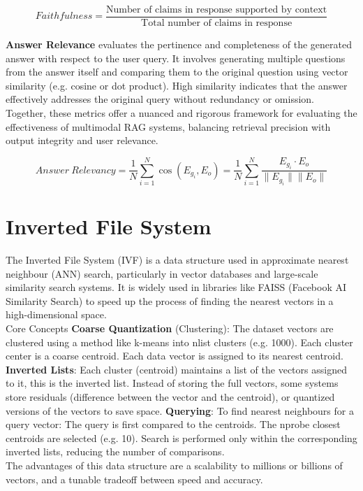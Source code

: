 \documentclass[12pt,twoside]{report}
\begin{document}
$$Faithfulness = \frac{\text{Number of claims in response supported by context}}{\text{Total number of claims in response}}$$

\textbf{Answer Relevance} evaluates the pertinence and completeness of the generated answer with respect to the user query. It involves generating multiple questions from the answer itself and comparing them to the original question using vector similarity (e.g. cosine or dot product). High similarity indicates that the answer effectively addresses the original query without redundancy or omission. \\
Together, these metrics offer a nuanced and rigorous framework for evaluating the effectiveness of multimodal RAG systems, balancing retrieval precision with output integrity and user relevance.

$$Answer~Relevancy = \frac{1}{N}\sum_{i=1}^{N} \cos(E_{g_i}, E_o) = \frac{1}{N}\sum_{i=1}^{N} \frac{E_{g_i} \cdot E_o}{\|E_{g_i}\| \|E_o\|}$$

\section{Inverted File System}
\label{appendix:invertedFileSystem}
The Inverted File System (IVF) is a data structure used in approximate nearest neighbour (ANN) search, particularly in vector databases and large-scale similarity search systems. It is widely used in libraries like FAISS (Facebook AI Similarity Search) to speed up the process of finding the nearest vectors in a high-dimensional space. \\

Core Concepts
\textbf{Coarse Quantization} (Clustering):
The dataset vectors are clustered using a method like k-means into nlist clusters (e.g. 1000). Each cluster center is a coarse centroid. Each data vector is assigned to its nearest centroid.
\textbf{Inverted Lists}:
Each cluster (centroid) maintains a list of the vectors assigned to it, this is the inverted list. Instead of storing the full vectors, some systems store residuals (difference between the vector and the centroid), or quantized versions of the vectors to save space.
\textbf{Querying}:
To find nearest neighbours for a query vector:
The query is first compared to the centroids.
The nprobe closest centroids are selected (e.g. 10).
Search is performed only within the corresponding inverted lists, reducing the number of comparisons. \\
The advantages of this data structure are a scalability to millions or billions of vectors, and a tunable tradeoff between speed and accuracy.
\end{document}
